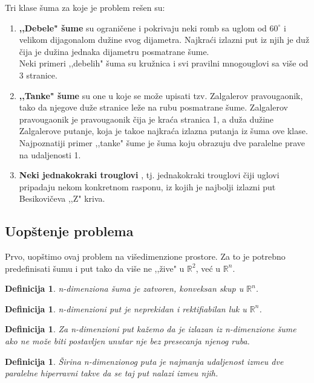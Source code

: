 \documentclass[11pt,letter]{article}
\newtheorem{df}[teo]{\bf Definicija}
\begin{document}
Tri klase \v suma za koje je problem re\v sen su:
\begin{enumerate}
\item \textbf{,,Debele" \v sume} \cite{Finch} su ograni\v cene i pokrivaju neki romb sa uglom od $60^\circ$ i velikom dijagonalom du\v zine svog dijametra. Najkra\' ci izlazni put iz njih je du\v z \v cija je du\v zina jednaka dijametru posmatrane \v sume. 
\\
Neki primeri  ,,debelih" \v suma su kru\v znica i svi pravilni mnogouglovi sa vi\v se od 3 stranice.
\item \textbf{,,Tanke" \v sume} \cite{Zalgaller} su one u koje se mo\v ze upisati tzv. Zalgalerov pravougaonik, tako da njegove du\v ze stranice le\v ze na rubu posmatrane \v sume. Zalgalerov pravougaonik je pravougaonik \v cija je kra\' ca stranica 1, a du\v za du\v zine Zalgalerove putanje, koja je tako\dj e najkra\' ca izlazna putanja iz \v suma ove klase.
\\
Najpoznatiji primer ,,tanke" \v sume je \v suma koju obrazuju dve paralelne prave na udaljenosti 1.
\item \textbf{Neki jednakokraki trouglovi} \cite{Besikovic}, tj. jednakokraki trouglovi \v ciji uglovi pripadaju nekom konkretnom rasponu, iz kojih je najbolji izlazni put Besikovi\v ceva ,,Z" kriva.
\end{enumerate}
\smallskip
\subsection[Uop\v stenje problema]{Uop\v stenje problema}
\bigskip
Prvo, uop\v stimo ovaj problem na vi\v sedimenzione prostore. Za to je potrebno predefinisati \v sumu i put tako da vi\v se ne ,,\v zive" u $\mathbb{R}^2$, ve\' c u $\mathbb{R}^n$.
\smallskip
\begin{df} n-dimenziona \v suma je zatvoren, konveksan skup u $\mathbb{R}^n$.\end{df}
\begin{df} n-dimenzioni put je neprekidan i rektifiabilan luk u $\mathbb{R}^n$.\end{df}
\begin{df} Za n-dimenzioni put ka\v zemo da je izlazan iz n-dimenzione \v sume ako ne mo\v ze biti postavljen unutar nje bez presecanja njenog ruba.\end{df}
\begin{df} \v Sirina n-dimenzionog puta je najmanja udaljenost izme\dj u dve paralelne hiperravni takve da se taj put nalazi izme\dj u njih. \end{df}
\smallskip
\end{document}
